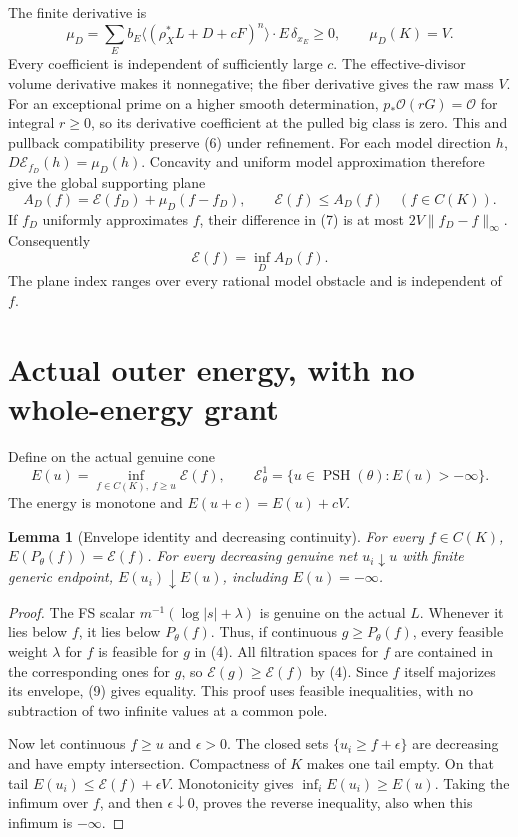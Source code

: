 \documentclass[11pt]{article}
\newtheorem{lemma}[theorem]{Lemma}
\newcommand{\PSH}{\operatorname{PSH}}
\newcommand{\EE}{\mathcal E^1_\theta}
\newcommand{\OO}{\mathcal O}
\begin{document}
The finite derivative is
\[
 \mu_D=\sum_E b_E\langle(\rho_X^*L+D+cF)^n\rangle\cdot E
                 \,\delta_{x_E}\geq0,
 \qquad \mu_D(K)=V.                                    \tag{6}
\]
Every coefficient is independent of sufficiently large $c$.
The effective-divisor volume derivative makes it nonnegative;
the fiber derivative gives the raw mass $V$.
For an exceptional prime on a higher smooth determination,
$p_*\OO(rG)=\OO$ for integral $r\geq0$, so its derivative
coefficient at the pulled big class is zero.
This and pullback compatibility preserve (6) under refinement.
For each model direction $h$,
$D\mathscr E_{f_D}(h)=\mu_D(h)$.
Concavity and uniform model approximation therefore give the global
supporting plane
\[
 A_D(f)=\mathscr E(f_D)+\mu_D(f-f_D),\qquad
 \mathscr E(f)\leq A_D(f)\quad(f\in C(K)).              \tag{7}
\]
If $f_D$ uniformly approximates $f$, their difference in (7) is
at most $2V\|f_D-f\|_\infty$. Consequently
\[
                    \mathscr E(f)=\inf_D A_D(f).        \tag{8}
\]
The plane index ranges over every rational model obstacle and is
independent of $f$.

\section{Actual outer energy, with no whole-energy grant}
Define on the actual genuine cone
\[
 E(u)=\inf_{f\in C(K),\ f\geq u}\mathscr E(f),\qquad
 \EE=\{u\in\PSH(\theta):E(u)>-\infty\}.                \tag{9}
\]
The energy is monotone and $E(u+c)=E(u)+cV$.

\begin{lemma}[Envelope identity and decreasing continuity]\label{outer}
For every $f\in C(K)$, $E(P_\theta(f))=\mathscr E(f)$.
For every decreasing genuine net $u_i\downarrow u$ with finite
generic endpoint, $E(u_i)\downarrow E(u)$, including $E(u)=-\infty$.
\end{lemma}
\begin{proof}
The FS scalar $m^{-1}(\log|s|+\lambda)$ is genuine on the actual $L$.
Whenever it lies below $f$, it lies below $P_\theta(f)$.
Thus, if continuous $g\geq P_\theta(f)$, every feasible weight
$\lambda$ for $f$ is feasible for $g$ in (4). All filtration
spaces for $f$ are contained in the corresponding ones for $g$,
so $\mathscr E(g)\geq\mathscr E(f)$ by (4).
Since $f$ itself majorizes its envelope, (9) gives equality.
This proof uses feasible inequalities, with no subtraction of two
infinite values at a common pole.

Now let continuous $f\geq u$ and $\epsilon>0$.
The closed sets $\{u_i\geq f+\epsilon\}$ are decreasing and
have empty intersection. Compactness of $K$ makes one tail empty.
On that tail $E(u_i)\leq\mathscr E(f)+\epsilon V$.
Monotonicity gives $\inf_iE(u_i)\geq E(u)$.
Taking the infimum over $f$, and then $\epsilon\downarrow0$,
proves the reverse inequality, also when this infimum is $-\infty$.
\end{proof}
\end{document}
